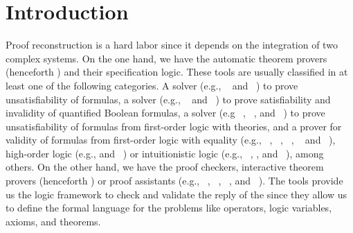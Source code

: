 \documentclass[../main.tex]{subfiles}
\begin{document}

\section{Introduction}
\label{sec:introduction}

Proof reconstruction is a hard labor since it depends on the integration
of two complex systems. On the one hand, we have the automatic theorem provers
(henceforth \ATP) and their specification logic. These tools are usually
classified in at least one of the following categories. A \SAT solver
(e.g., ~\cite{Moskewicz2001} and ~\cite{Een2004})
to prove unsatisfiability of \CNF formulas, a  solver
(e.g., ~\cite{Klieber2014} and ~\cite{Lonsing2017})
to prove satisfiability and invalidity of quantified Boolean formulas, a \SMT
solver (e.g ~\cite{Barrett2011}, ~\cite{bouton2009},
and ~\cite{DeMoura2008}) to prove unsatisfiability of formulas
from first-order logic with theories, and a prover for validity of
formulas from first-order logic with equality
(e.g., ~\cite{Schulz:AICOM-2002}, ~\cite{Otten2008},
\Metis~\cite{hurd2003first},  ~\cite{Weidenbach2009} and
~\cite{Riazanov1999}), high-order logic (e.g., 
\cite{Benzmuller2008} and ~\cite{Brown2012}) or intuitionistic
logic (e.g., ~\cite{Otten2008}, 
\cite{Schmitt2001}, and ~\cite{Tammet1997}), among others.
On the other hand, we have the proof checkers, interactive theorem provers
(henceforth \ITP) or proof assistants (e.g., \Agda~\cite{agdateam},
~\cite{coqteam}, ~\cite{paulson1994isabelle}, and
~\cite{norrish2007hol}).
The \ITP tools provide us the logic framework to check and validate the
reply of the \ATPs since they allow us to define the formal language for
the problems like operators, logic variables, axioms, and theorems.
\end{document}
